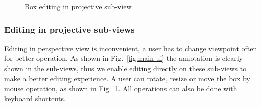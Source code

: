 \documentclass[letterpaper, 10 pt, conference]{ieeeconf}  %
\begin{document}
\begin{figure}[t]
	\centering
	\caption{Box editing in projective sub-view}
	\label{fig:box-mouse-edit-subview}
\end{figure}

\subsubsection{Editing in projective sub-views}
Editing in perspective view is inconvenient,  a user has to change viewpoint often for better operation. As shown in Fig.~\ref{fig:main-ui} the annotation is clearly shown in the sub-views, thus we enable editing directly on these sub-views to make a better editing experience. A user can rotate, resize or move the box by mouse operation, as shown in Fig.~\ref{fig:box-mouse-edit-subview}.
All operations can also be done with keyboard shortcuts.
\end{document}
